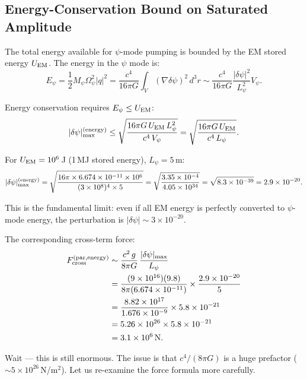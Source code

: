 \documentclass[11pt]{article}
\begin{document}
\subsection{Energy-Conservation Bound on Saturated Amplitude}

The total energy available for $\psi$-mode pumping is bounded by the
EM stored energy $U_{\rm EM}$. The energy in the $\psi$ mode is:
\begin{equation}
E_\psi = \frac{1}{2}M_\psi\Omega_\psi^2|q|^2
  = \frac{c^4}{16\pi G}\int_V (\nabla\delta\psi)^2\,d^3r
  \sim \frac{c^4}{16\pi G}\frac{|\delta\psi|^2}{L_\psi^2}V_\psi.
\end{equation}

Energy conservation requires $E_\psi \leq U_{\rm EM}$:
\begin{equation}
|\delta\psi|_{\rm max}^{(\rm energy)} \leq
  \sqrt{\frac{16\pi G\,U_{\rm EM}\,L_\psi^2}{c^4\,V_\psi}}
  = \sqrt{\frac{16\pi G\,U_{\rm EM}}{c^4\,L_\psi}}.
\end{equation}

For $U_{\rm EM} = 10^6$\,J (1\,MJ stored energy), $L_\psi = 5$\,m:
\begin{equation}
|\delta\psi|_{\rm max}^{(\rm energy)}
  = \sqrt{\frac{16\pi \times 6.674 \times 10^{-11} \times 10^6}
  {(3 \times 10^8)^4 \times 5}}
  = \sqrt{\frac{3.35 \times 10^{-4}}{4.05 \times 10^{34}}}
  = \sqrt{8.3 \times 10^{-39}}
  = 2.9 \times 10^{-20}.
\end{equation}

This is the fundamental limit: even if all EM energy is perfectly converted
to $\psi$-mode energy, the perturbation is $|\delta\psi| \sim 3 \times 10^{-20}$.

The corresponding cross-term force:
\begin{align}
F_{\rm cross}^{(\rm par,energy)}
  &\sim \frac{c^2\,g}{8\pi G}\,\frac{|\delta\psi|_{\rm max}}{L_\psi} \notag \\
  &= \frac{(9 \times 10^{16})(9.8)}{8\pi(6.674 \times 10^{-11})}
    \times \frac{2.9 \times 10^{-20}}{5} \notag \\
  &= \frac{8.82 \times 10^{17}}{1.676 \times 10^{-9}}
    \times 5.8 \times 10^{-21} \notag \\
  &= 5.26 \times 10^{26} \times 5.8 \times 10^{-21} \notag \\
  &= 3.1 \times 10^{6}\,\text{N}.
\end{align}

Wait --- this is still enormous. The issue is that $c^4/(8\pi G)$ is
a huge prefactor ($\sim 5 \times 10^{26}$\,N/m$^2$). Let us re-examine
the force formula more carefully.
\end{document}
